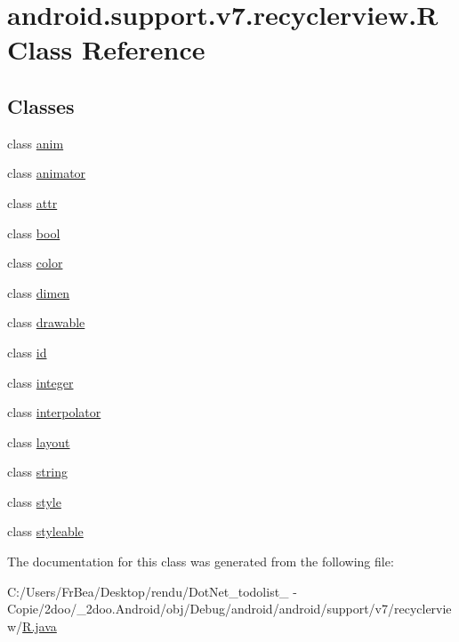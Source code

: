 \hypertarget{classandroid_1_1support_1_1v7_1_1recyclerview_1_1_r}{
\section{android.support.v7.recyclerview.R Class Reference}
\label{classandroid_1_1support_1_1v7_1_1recyclerview_1_1_r}
}
\subsection*{Classes}
\begin{CompactItemize}
\item 
class \hyperlink{classandroid_1_1support_1_1v7_1_1recyclerview_1_1_r_1_1anim}{anim}
\item 
class \hyperlink{classandroid_1_1support_1_1v7_1_1recyclerview_1_1_r_1_1animator}{animator}
\item 
class \hyperlink{classandroid_1_1support_1_1v7_1_1recyclerview_1_1_r_1_1attr}{attr}
\item 
class \hyperlink{classandroid_1_1support_1_1v7_1_1recyclerview_1_1_r_1_1bool}{bool}
\item 
class \hyperlink{classandroid_1_1support_1_1v7_1_1recyclerview_1_1_r_1_1color}{color}
\item 
class \hyperlink{classandroid_1_1support_1_1v7_1_1recyclerview_1_1_r_1_1dimen}{dimen}
\item 
class \hyperlink{classandroid_1_1support_1_1v7_1_1recyclerview_1_1_r_1_1drawable}{drawable}
\item 
class \hyperlink{classandroid_1_1support_1_1v7_1_1recyclerview_1_1_r_1_1id}{id}
\item 
class \hyperlink{classandroid_1_1support_1_1v7_1_1recyclerview_1_1_r_1_1integer}{integer}
\item 
class \hyperlink{classandroid_1_1support_1_1v7_1_1recyclerview_1_1_r_1_1interpolator}{interpolator}
\item 
class \hyperlink{classandroid_1_1support_1_1v7_1_1recyclerview_1_1_r_1_1layout}{layout}
\item 
class \hyperlink{classandroid_1_1support_1_1v7_1_1recyclerview_1_1_r_1_1string}{string}
\item 
class \hyperlink{classandroid_1_1support_1_1v7_1_1recyclerview_1_1_r_1_1style}{style}
\item 
class \hyperlink{classandroid_1_1support_1_1v7_1_1recyclerview_1_1_r_1_1styleable}{styleable}
\end{CompactItemize}


The documentation for this class was generated from the following file:\begin{CompactItemize}
\item 
C:/Users/FrBea/Desktop/rendu/DotNet\_\-todolist\_ - Copie/2doo/\_\-2doo.Android/obj/Debug/android/android/support/v7/recyclerview/\hyperlink{android_2support_2v7_2recyclerview_2_r_8java}{R.java}\end{CompactItemize}
